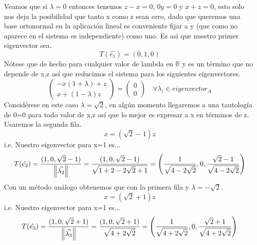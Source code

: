 \documentclass{article}
\begin{document}
Veamos que si $\lambda=0$ entonces tenemos $z-x=0$, $0y = 0$ y $x+z=0$, esto solo nos deja la posibilidad que tanto x como z sean cero, dado que queremos una base ortonormal en la aplicación lineal es conveniente fijar a y (que como no aparece en el sistema es independiente) como uno. Es así que nuestro primer eigenvector sea.
\begin{equation*}
    T(\hat{e_1}) = (0,1,0)
\end{equation*}
Nótese que de hecho para cualquier valor de lambda en $\mathbb{R}$ y es un término que no depende de x,z así que reducimos el sistema para los siguientes eigenvectores.
\begin{equation*}
    \begin{pmatrix}
        -x(1+\lambda)+z \\
        x + (1-\lambda)z
    \end{pmatrix} =
    \begin{pmatrix}
        0 \\ 0
    \end{pmatrix} \quad \forall \lambda_i \in eigenvector_A
\end{equation*}
Considérese en este caso $\lambda=\sqrt{2}$, en algún momento llegaremos a una tautología de 0=0 para todo valor de x,z así que lo mejor es expresar a x en términos de z. Usaremos la segunda fila.
\begin{equation*}
    x = (\sqrt{2}-1)z
\end{equation*}
i.e. Nuestro eigenvector para x=1 es...
\begin{equation*}
    T(\hat{e_2}) = \frac{(1, 0, \sqrt{2}-1)}{\norm{\Vec{\lambda_2}}} = \frac{(1, 0, \sqrt{2}-1)}{\sqrt{1+2-2\sqrt{2}+1}} = \left( \frac{1}{\sqrt{4-2\sqrt{2}}}, 0, \frac{\sqrt{2}-1}{\sqrt{4-2\sqrt{2}}}\right)
\end{equation*}
Con un método análogo obtenemos que con la primera fila y $\lambda=-\sqrt{2}$.
\begin{equation*}
    x=(\sqrt{2}+1)z
\end{equation*}
i.e. Nuestro eigenvector para x=1 es...
\begin{equation*}
    T(\hat{e_3}) = \frac{(1, 0, \sqrt{2}+1)}{\norm{\Vec{\lambda_3}}} = \frac{(1, 0, \sqrt{2}+1)}{\sqrt{4+2\sqrt{2}}} = \left(\frac{1}{\sqrt{4+2\sqrt{2}}},0,\frac{\sqrt{2}+1}{\sqrt{4+2\sqrt{2}}}\right)
\end{equation*}
\end{document}
